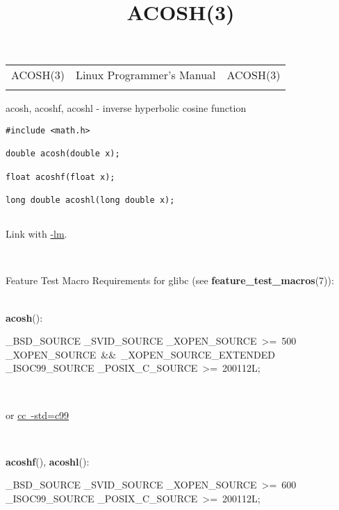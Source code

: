 \documentclass[]{article}
\title{ACOSH(3)}
\author{}
\date{}
\let\realtextbf=\textbf
\renewcommand{\textbf}[1]{\textcolor{boldcolor}{\realtextbf{#1}}}
\renewcommand{\emph}[1]{\underline{#1}}
\begin{document}
\maketitle

\begin{longtable}[c]{@{}lll@{}}
\toprule\addlinespace
ACOSH(3) & Linux Programmer's Manual & ACOSH(3)
\\\addlinespace
\bottomrule
\end{longtable}


acosh, acoshf, acoshl - inverse hyperbolic cosine function


\begin{verbatim}
#include <math.h>
 
double acosh(double x);
 
float acoshf(float x);
 
long double acoshl(long double x);
 
\end{verbatim}

Link with \emph{-lm}.

~

Feature Test Macro Requirements for glibc (see
\textbf{feature\_test\_macros}(7)): \\

~

\textbf{acosh}():

\_BSD\_SOURCE \textbar{}\textbar{} \_SVID\_SOURCE \textbar{}\textbar{}
\_XOPEN\_SOURCE~\textgreater{}=~500 \textbar{}\textbar{}
\_XOPEN\_SOURCE~\&\&~\_XOPEN\_SOURCE\_EXTENDED \textbar{}\textbar{}
\_ISOC99\_SOURCE \textbar{}\textbar{}
\_POSIX\_C\_SOURCE~\textgreater{}=~200112L;

~

or \emph{cc~-std=c99}

~

\textbf{acoshf}(), \textbf{acoshl}():

\_BSD\_SOURCE \textbar{}\textbar{} \_SVID\_SOURCE \textbar{}\textbar{}
\_XOPEN\_SOURCE~\textgreater{}=~600 \textbar{}\textbar{}
\_ISOC99\_SOURCE \textbar{}\textbar{}
\_POSIX\_C\_SOURCE~\textgreater{}=~200112L;

~
\end{document}
